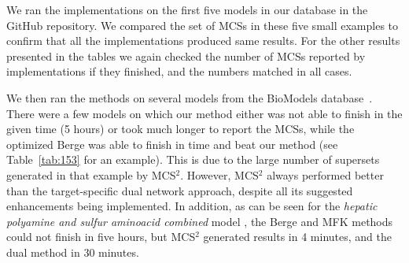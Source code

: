 \documentclass{bioinfo}
\theoremstyle{plain}
\theoremstyle{definition}
\begin{document}
We ran the implementations on the first five models in our database in the GitHub repository. We compared the set of MCSs in these five small examples to confirm that all the implementations produced same results. For the other results presented in the tables we again checked the number of MCSs reported by implementations if they finished, and the numbers matched in all cases.
\begin{table}
    \centering

       \caption{Result of running MCS$^2$-MILP and MCSEnumerator on the \textit{E coli iAF1260} network with 2382 reactions (981 reactions after compression).} 
\end{table}
We then ran the methods on several models from the BioModels database~\cite{Biomodels}. There were a few models on which our method either was not able to finish in the given time (5 hours) or took much longer to report the MCSs, while the optimized Berge was able to finish in time and beat our method (see Table~\ref{tab:153} for an example). This is due to the large number of supersets generated in that example by MCS$^2$. However, MCS$^2$ always performed better than the target-specific dual network approach, despite all its suggested enhancements being implemented. In addition, as can be seen for the \textit{hepatic polyamine and sulfur aminoacid combined} model \cite{combinedModel}, the Berge and MFK methods could not finish in five hours, but MCS$^2$ generated results in 4 minutes, and the dual method in 30 minutes. 
\end{document}
